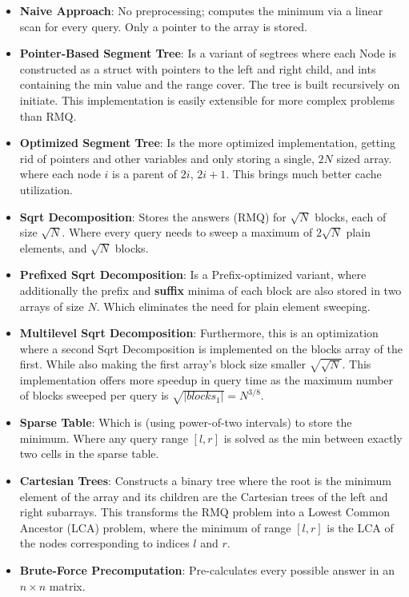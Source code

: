 \documentclass[a4paper,UKenglish,cleveref,thm-restate]{lipics-v2021}
\begin{document}
\begin{itemize}
    \item \textbf{Naive Approach}: No preprocessing; computes the minimum via a linear scan for every query. Only a pointer to the array is stored.
    \item \textbf{Pointer-Based Segment Tree}: Is a variant of segtrees where each Node is constructed as a struct with pointers to the left and right child, and ints containing the min value and the range cover. The tree is built recursively on initiate. This implementation is easily extensible for more complex problems than RMQ. 
    \item \textbf{Optimized Segment Tree}: Is the more optimized implementation, getting rid of pointers and other variables and only storing a single, $2N$ sized array. where each node $i$ is a parent of $2i$, $2i+1$. This brings much better cache utilization.
    \item \textbf{Sqrt Decomposition}: Stores the answers (RMQ) for $\sqrt{N}$ blocks, each of size $\sqrt{N}$. Where every query needs to sweep a maximum of $2\sqrt{N}$ plain elements, and $\sqrt{N}$ blocks.
    \item \textbf{Prefixed Sqrt Decomposition}: Is a Prefix-optimized variant, where additionally the prefix and \textbf{suffix} minima of each block are also stored in two arrays of size $N$. Which eliminates the need for plain element sweeping.
    \item \textbf{Multilevel Sqrt Decomposition}: Furthermore, this is an optimization where a second Sqrt Decomposition is implemented on the blocks array of the first. While also making the first array's block size smaller $\sqrt{\sqrt{N}}$. This implementation offers more speedup in query time as the maximum number of blocks sweeped per query is $\sqrt{|blocks_1|} = N^{3/8}$.
    \item \textbf{Sparse Table}: Which is (using power-of-two intervals) to store the minimum. Where any query range $[l, r]$ is solved as the min between exactly two cells in the sparse table. 
    \item \textbf{Cartesian Trees}: Constructs a binary tree where the root is the minimum element of the array and its children are the Cartesian trees of the left and right subarrays. This transforms the RMQ problem into a Lowest Common Ancestor (LCA) problem, where the minimum of range $[l, r]$ is the LCA of the nodes corresponding to indices $l$ and $r$.
    \item \textbf{Brute-Force Precomputation}: Pre-calculates every possible answer in an $n \times n$ matrix.
\end{itemize}
\end{document}
